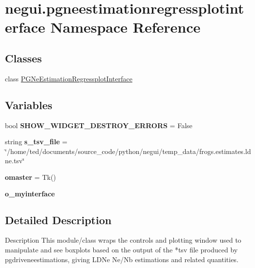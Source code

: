 \hypertarget{namespacenegui_1_1pgneestimationregressplotinterface}{}\section{negui.\+pgneestimationregressplotinterface Namespace Reference}
\label{namespacenegui_1_1pgneestimationregressplotinterface}
\subsection*{Classes}
\begin{DoxyCompactItemize}
\item 
class \hyperlink{classnegui_1_1pgneestimationregressplotinterface_1_1PGNeEstimationRegressplotInterface}{P\+G\+Ne\+Estimation\+Regressplot\+Interface}
\end{DoxyCompactItemize}
\subsection*{Variables}
\begin{DoxyCompactItemize}
\item 
bool {\bfseries S\+H\+O\+W\+\_\+\+W\+I\+D\+G\+E\+T\+\_\+\+D\+E\+S\+T\+R\+O\+Y\+\_\+\+E\+R\+R\+O\+RS} = False\hypertarget{namespacenegui_1_1pgneestimationregressplotinterface_ad2509fa1e3c9641c29fb812f92c2e210}{}\label{namespacenegui_1_1pgneestimationregressplotinterface_ad2509fa1e3c9641c29fb812f92c2e210}

\item 
string {\bfseries s\+\_\+tsv\+\_\+file} = \char`\"{}/home/ted/documents/source\+\_\+code/python/negui/temp\+\_\+data/frogs.\+estimates.\+ldne.\+tsv\char`\"{}\hypertarget{namespacenegui_1_1pgneestimationregressplotinterface_ac8ea2f142cc0d4bd53395f3e29ab9dd1}{}\label{namespacenegui_1_1pgneestimationregressplotinterface_ac8ea2f142cc0d4bd53395f3e29ab9dd1}

\item 
{\bfseries omaster} = Tk()\hypertarget{namespacenegui_1_1pgneestimationregressplotinterface_abb78225f6a745401a7628d49438fb65b}{}\label{namespacenegui_1_1pgneestimationregressplotinterface_abb78225f6a745401a7628d49438fb65b}

\item 
{\bfseries o\+\_\+myinterface}
\end{DoxyCompactItemize}


\subsection{Detailed Description}
\begin{DoxyVerb}Description
This module/class wraps the controls and plotting
window used to manipulate and see boxplots
based on the output of the *tsv file produced
by pgdriveneestimations, giving LDNe Ne/Nb 
estimations and related quantities.
\end{DoxyVerb}
 

